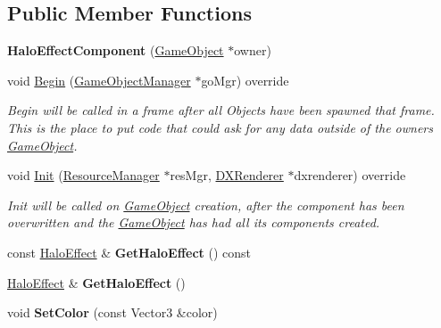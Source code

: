 \subsection*{Public Member Functions}
\begin{DoxyCompactItemize}
\item 
\mbox{\label{classHaloEffectComponent_af20298bd795f9fb086590b1e74bfeaee}} 
{\bfseries Halo\+Effect\+Component} (\hyperlink{classGameObject}{Game\+Object} $\ast$owner)
\item 
void \hyperlink{classHaloEffectComponent_a1845e41e3c47faf344ee4842c3b25737}{Begin} (\hyperlink{classGameObjectManager}{Game\+Object\+Manager} $\ast$go\+Mgr) override
\begin{DoxyCompactList}\small\item\em Begin will be called in a frame after all Objects have been spawned that frame. This is the place to put code that could ask for any data outside of the owner\textquotesingle{}s \hyperlink{classGameObject}{Game\+Object}. \end{DoxyCompactList}\item 
void \hyperlink{classHaloEffectComponent_aa5ebc7c6bf980154f6ee203694ebb824}{Init} (\hyperlink{classResourceManager}{Resource\+Manager} $\ast$res\+Mgr, \hyperlink{classDXRenderer}{D\+X\+Renderer} $\ast$dxrenderer) override
\begin{DoxyCompactList}\small\item\em Init will be called on \hyperlink{classGameObject}{Game\+Object} creation, after the component has been overwritten and the \hyperlink{classGameObject}{Game\+Object} has had all its components created. \end{DoxyCompactList}\item 
\mbox{\label{classHaloEffectComponent_a465079c2adf862183d9d44eb29de1aae}} 
const \hyperlink{classHaloEffect}{Halo\+Effect} \& {\bfseries Get\+Halo\+Effect} () const
\item 
\mbox{\label{classHaloEffectComponent_a332ff98a8ee9a183a4eaf30d55fef86e}} 
\hyperlink{classHaloEffect}{Halo\+Effect} \& {\bfseries Get\+Halo\+Effect} ()
\item 
\mbox{\label{classHaloEffectComponent_a9ed79184613947da5b8a46e74e4091e3}} 
void {\bfseries Set\+Color} (const Vector3 \&color)
\end{DoxyCompactItemize}
